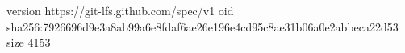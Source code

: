 version https://git-lfs.github.com/spec/v1
oid sha256:7926696d9e3a8ab99a6e8fdaf6ae26e196e4cd95c8ae31b06a0e2abbeca22d53
size 4153
